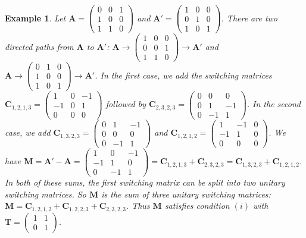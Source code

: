 \documentclass{article}
\newtheorem{example}{Example}
\newcommand{\rar}{\rightarrow}
\newcommand{\A}{\mathbf A}
\newcommand{\C}{\mathbf C}
\newcommand{\M}{\mathbf M}
\newcommand{\T}{\mathbf T}
\begin{document}
\begin{example}\label{ex1}
Let $\A=\begin{pmatrix}
0&0&1\\
1&0&0\\
1&1&0
\end{pmatrix}$ and $\A'=\begin{pmatrix}
1&0&0\\
0&1&0\\
1&0&1
\end{pmatrix}$. There are two directed paths from $\A$ to $\A'$: $\A\rar\begin{pmatrix}
1&0&0\\
0&0&1\\
1&1&0
\end{pmatrix}\rar\A'$ and $\A\rar\begin{pmatrix}
0&1&0\\
1&0&0\\
1&0&1
\end{pmatrix}\rar\A'$. In the first case, we add the switching matrices $\C_{1,2,1,3}=\begin{pmatrix}
1&0&-1\\
-1&0&1\\
0&0&0
\end{pmatrix}$ followed by $\C_{2,3,2,3}=\begin{pmatrix}
0&0&0\\
0&1&-1\\
0&-1&1
\end{pmatrix}$. In the second case, we add $\C_{1,3,2,3}=\begin{pmatrix}
0&1&-1\\
0&0&0\\
0&-1&1
\end{pmatrix}$ and $\C_{1,2,1,2}=\begin{pmatrix}
1&-1&0\\
-1&1&0\\
0&0&0
\end{pmatrix}$. We have $\M=\A'-\A=\begin{pmatrix}
1&0&-1\\
-1&1&0\\
0&-1&1
\end{pmatrix}=\C_{1,2,1,3}+\C_{2,3,2,3}=\C_{1,3,2,3}+\C_{1,2,1,2}$. In both of these sums, the first switching matrix can be split into two unitary switching matrices. So $\M$ is the sum of three unitary switching matrices: $\M=\C_{1,2,1,2}+\C_{1,2,2,3}+\C_{2,3,2,3}$. Thus $\M$ satisfies condition $(i)$ with $\T=\begin{pmatrix}
1&1\\
0&1
\end{pmatrix}$. 
\end{example}
\end{document}
